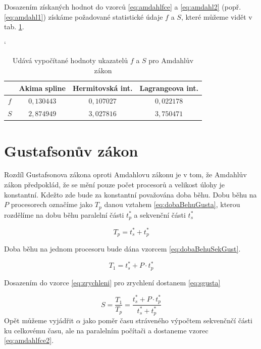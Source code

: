 \documentclass{article}
\begin{document}
	Dosazením získaných hodnot do vzorců \ref{eq:amdahlfce} a \ref{eq:amdahl2} (popř. \ref{eq:amdahl1}) získáme požadované statistické údaje $f$ a $S$, které můžeme vidět v tab. \ref{tab:amdahlFinal}.
	
	\begin{table}[h]
	\centering
	\catcode`
	\def\arraystretch{1.2}
	\begin{tabular}{|c|c|c|c|}
	\hline
	\textbf{}   & \textbf{Akima spline} & \textbf{Hermitovská int.} &  \textbf{Lagrangeova int.} \\ \hline
	\hline
	$f$    		  & $0,130443$                  &  $0,107027$     		  &       $0,022178$                     \\ \hline
	$S$                  &  $2,874949$                  &   $3,027816$               &      $3,750471$                         \\ \hline
	\end{tabular}
	\caption{Udává vypočítané hodnoty ukazatelů $f$ a $S$ pro Amdahlův zákon}
	\label{tab:amdahlFinal}
	\end{table}
	
	\section{Gustafsonův zákon}
	Rozdíl Gustafsonova zákona oproti Amdahlovu zákonu je v tom, že Amdahlův zákon předpoklád, že se mění pouze počet procesorů a velikost úlohy je konstantní. Kdežto zde bude za konstantní považována doba běhu. Dobu běhu na $P$ procesorech označíme jako $T_{p}$ danou vztahem \ref{eq:dobaBehuGusta}, kterou rozdělíme na dobu běhu paralelní části  $t_{p}^{*}$ a sekvenční části  $t_{s}^{*}$
	
	\begin{equation} 
	T_{p} = t_{s}^{*} + t_{p}^{*} 
	\label{eq:dobaBehuGusta}
	\end{equation}
	
	Doba běhu na jednom procesoru bude dána vzorcem \ref{eq:dobaBehuSekGust}.
	
	\begin{equation} 
	T_{1} = t_{s}^{*} + P \cdot t_{p}^{*} 
	\label{eq:dobaBehuSekGust}
	\end{equation}
	
	Dosazením do vzorce \ref{eq:zrychleni} pro zrychlení dostanem \ref{eq:sgusta}
	
	
	\begin{equation} 
	S=\frac{T_{1}}{T_{p}} = \frac{t_{s}^{*} + P \cdot t_{p}^{*} }{t_{s}^{*} + t_{p}^{*}}
	\label{eq:sgusta}
	\end{equation}
	Opět můžeme vyjádřit $\alpha$ jako poměr času stráveného výpočtem sekvenčnčí části ku celkovému času, ale na paralelním počítači a  dostaneme vzorec \ref{eq:amdahlfce2}.
	
\end{document}
